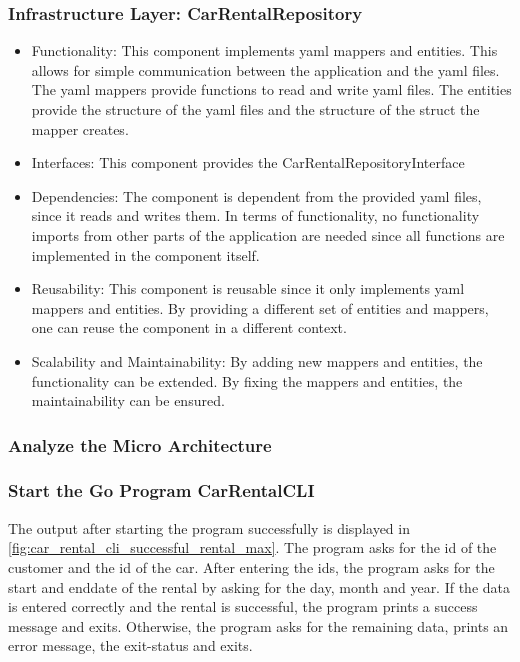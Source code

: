 \subsubsection*{Infrastructure Layer: CarRentalRepository}
\begin{itemize}
    \item Functionality: This component implements yaml mappers and entities. 
          This allows for simple communication between the application and the yaml files.
          The yaml mappers provide functions to read and write yaml files.
          The entities provide the structure of the yaml files and the structure of the struct the mapper creates.
    \item Interfaces: This component provides the CarRentalRepositoryInterface
    \item Dependencies: The component is dependent from the provided yaml files, since it reads and writes them.
          In terms of functionality, no functionality imports from other parts of the application are needed since all functions are implemented in the component itself.
    \item Reusability: This component is reusable since it only implements yaml mappers and entities.
          By providing a different set of entities and mappers, one can reuse the component in a different context.
    \item Scalability and Maintainability: By adding new mappers and entities, the functionality can be extended.
          By fixing the mappers and entities, the maintainability can be ensured.
\end{itemize}

\subsubsection*{Analyze the Micro Architecture}

\subsubsection*{Start the Go Program CarRentalCLI}
The output after starting the program successfully is displayed in \autoref{fig:car_rental_cli_successful_rental_max}.
The program asks for the id of the customer and the id of the car.
After entering the ids, the program asks for the start and enddate of the rental by asking for the day, month and year.
If the data is entered correctly and the rental is successful, the program prints a success message and exits.
Otherwise, the program asks for the remaining data, prints an error message, the exit-status and exits.

